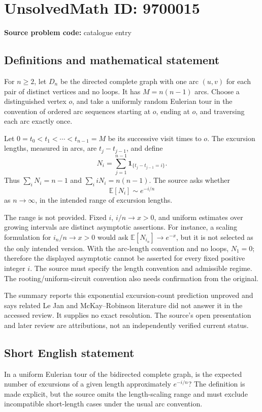 \documentclass[11pt]{article}
\begin{document}
\section*{UnsolvedMath ID: 9700015}
\textbf{Source problem code:} catalogue entry
\subsection{Definitions and mathematical statement}
For \(n\ge2\), let \(D_n\) be the directed complete graph with one arc \((u,v)\) for each pair of distinct vertices and no loops. It has \(M=n(n-1)\) arcs. Choose a distinguished vertex \(o\), and take a uniformly random Eulerian tour in the convention of ordered arc sequences starting at \(o\), ending at \(o\), and traversing each arc exactly once.

Let \(0=t_0<t_1<\cdots<t_{n-1}=M\) be its successive visit times to \(o\). The excursion lengths, measured in arcs, are \(t_j-t_{j-1}\), and define
\[
 N_i=\sum_{j=1}^{n-1}\mathbf1_{\{t_j-t_{j-1}=i\}}.
\]
Thus \(\sum_iN_i=n-1\) and \(\sum_i iN_i=n(n-1)\). The source asks whether
\[
 \mathbb E[N_i]\sim e^{-i/n}
\]
as \(n\to\infty\), in the intended range of excursion lengths.

The range is not provided. Fixed \(i\), \(i/n\to x>0\), and uniform estimates over growing intervals are distinct asymptotic assertions. For instance, a scaling formulation for \(i_n/n\to x>0\) would ask \(\mathbb E[N_{i_n}]\to e^{-x}\), but it is not selected as the only intended version. With the arc-length convention and no loops, \(N_1=0\); therefore the displayed asymptotic cannot be asserted for every fixed positive integer \(i\). The source must specify the length convention and admissible regime. The rooting/uniform-circuit convention also needs confirmation from the original.

The summary reports this exponential excursion-count prediction unproved and says related Le Jan and McKay--Robinson literature did not answer it in the accessed review. It supplies no exact resolution. The source's open presentation and later review are attributions, not an independently verified current status.
\subsection{Short English statement}
In a uniform Eulerian tour of the bidirected complete graph, is the expected number of excursions of a given length approximately \(e^{-i/n}\)? The definition is made explicit, but the source omits the length-scaling range and must exclude incompatible short-length cases under the usual arc convention.
\end{document}
